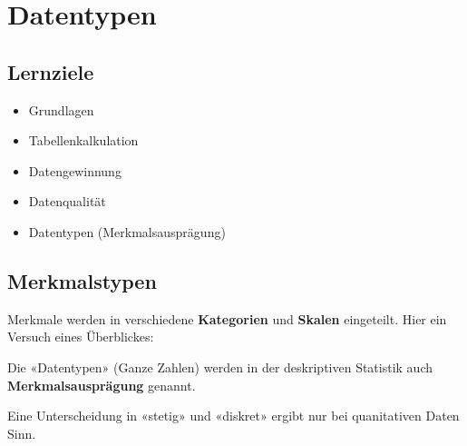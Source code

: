 
\section{Datentypen}

\subsection*{Lernziele}

\begin{itemize}
  \item Grundlagen
  \item Tabellenkalkulation
  \item Datengewinnung
  \item Datenqualität
  \item Datentypen (Merkmalsausprägung)
\end{itemize}


\newpage
\subsection{Merkmalstypen}
Merkmale werden in verschiedene \textbf{Kategorien} und \textbf{Skalen} eingeteilt. Hier ein Versuch eines Überblickes:




Die «Datentypen» (\zB Ganze Zahlen) werden in der deskriptiven
Statistik auch \textbf{Merkmalsausprägung} genannt.
\newpage

Eine Unterscheidung in «stetig» und
«diskret» ergibt nur bei quanitativen Daten Sinn.

\newpage




